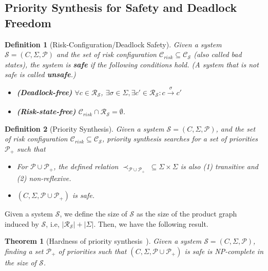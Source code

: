 \documentclass[10pt, a4paper, onecolumn, conference, compsocconf]{IEEEtran}
\newcommand{\sys}{\mathcal{S}}
\newcommand{\system}{\mathcal{S}}
\newcommand{\reach}{\mathcal{R}_{\system}\xspace}
\newcommand{\conf}{\mathcal{C}_{\system}\xspace}
\newtheorem{defi}{Definition}
\newtheorem{theo}{Theorem}
\begin{document}
\subsection{Priority Synthesis for Safety and Deadlock Freedom\label{subsec.algo.prioritysyn.def.priority.syn}}


\begin{defi}[Risk-Configuration/Deadlock Safety]
  Given a system $\mathcal{S} = (C , \Sigma, \mathcal{P})$ and the set
  of \emph{risk configuration} $\mathcal{C}_{risk} \subseteq \conf$ (also called \emph{bad states}), the system is \textbf{safe}
  if the following conditions hold. (A system that is not safe is called \textbf{unsafe}.)


\begin{itemize}
    \item {\bf (Deadlock-free)}
$\forall c \in \reach$, $\exists
      \sigma\in\Sigma, \exists c' \in \mathcal{R}_{\mathcal{S}}: c \xrightarrow[]{\sigma} c'$
\item {\bf (Risk-state-free)}
$\mathcal{C}_{risk} \cap \reach  = \emptyset$.
\end{itemize}
\end{defi}


\begin{defi}[Priority Synthesis]
  Given a system $\mathcal{S} = (C , \Sigma, \mathcal{P})$, and the
  set of risk configuration $\mathcal{C}_{risk} \subseteq \mathcal{C}_\sys$, priority synthesis
  searches for a set of priorities $\mathcal{P}_{+}$ such that
 \begin{itemize}
    \item For $\mathcal{P}\cup\mathcal{P}_{+}$, the defined relation $\prec_{\mathcal{P}\cup\mathcal{P}_{+}} \; \subseteq\Sigma\times\Sigma$ is also (1) transitive and (2) non-reflexive.
    \item $(C , \Sigma, \mathcal{P}\cup\mathcal{P}_{+})$ is safe.
 \end{itemize}
\end{defi}

Given a system $\system$,  we define the size of $\system$ as the size of the product graph induced by $\system$, i.e, $|\reach|+ |\Sigma|$. Then, we have the following result.

\begin{theo}[Hardness of priority synthesis~\cite{cheng:hardness:2011}]
  Given a system $\mathcal{S} = (C , \Sigma, \mathcal{P})$, finding a set
  $\mathcal{P}_{+}$ of priorities such that
  $(C , \Sigma, \mathcal{P}\cup\mathcal{P}_{+})$ is safe is NP-complete in the size of $\mathcal{S}$.
\end{theo}
\end{document}
